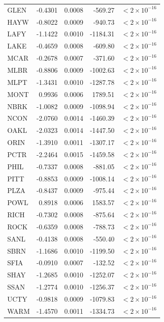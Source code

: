 \documentclass[11pt, letterpaper]{article}
\begin{document}
\begin{longtable}{lrrrr}
GLEN  & -0.4301 & 0.0008 &  -569.27 & $<2\times10^{-16}$ \\
HAYW  & -0.8022 & 0.0009 &  -940.73 & $<2\times10^{-16}$ \\
LAFY  & -1.1422 & 0.0010 & -1184.31 & $<2\times10^{-16}$ \\
LAKE  & -0.4659 & 0.0008 &  -609.80 & $<2\times10^{-16}$ \\
MCAR  & -0.2678 & 0.0007 &  -371.60 & $<2\times10^{-16}$ \\
MLBR  & -0.8806 & 0.0009 & -1002.63 & $<2\times10^{-16}$ \\
MLPT  & -1.3431 & 0.0010 & -1287.78 & $<2\times10^{-16}$ \\
MONT  &  0.9936 & 0.0006 &  1789.51 & $<2\times10^{-16}$ \\
NBRK  & -1.0082 & 0.0009 & -1098.94 & $<2\times10^{-16}$ \\
NCON  & -2.0760 & 0.0014 & -1460.39 & $<2\times10^{-16}$ \\
OAKL  & -2.0323 & 0.0014 & -1447.50 & $<2\times10^{-16}$ \\
ORIN  & -1.3910 & 0.0011 & -1307.17 & $<2\times10^{-16}$ \\
PCTR  & -2.2464 & 0.0015 & -1459.58 & $<2\times10^{-16}$ \\
PHIL  & -0.7337 & 0.0008 &  -881.05 & $<2\times10^{-16}$ \\
PITT  & -0.8853 & 0.0009 & -1008.14 & $<2\times10^{-16}$ \\
PLZA  & -0.8437 & 0.0009 &  -975.44 & $<2\times10^{-16}$ \\
POWL  &  0.8918 & 0.0006 &  1583.57 & $<2\times10^{-16}$ \\
RICH  & -0.7302 & 0.0008 &  -875.64 & $<2\times10^{-16}$ \\
ROCK  & -0.6359 & 0.0008 &  -788.73 & $<2\times10^{-16}$ \\
SANL  & -0.4138 & 0.0008 &  -550.40 & $<2\times10^{-16}$ \\
SBRN  & -1.1686 & 0.0010 & -1199.50 & $<2\times10^{-16}$ \\
SFIA  & -0.0910 & 0.0007 &  -132.52 & $<2\times10^{-16}$ \\
SHAY  & -1.2685 & 0.0010 & -1252.07 & $<2\times10^{-16}$ \\
SSAN  & -1.2774 & 0.0010 & -1256.37 & $<2\times10^{-16}$ \\
UCTY  & -0.9818 & 0.0009 & -1079.83 & $<2\times10^{-16}$ \\
WARM  & -1.4570 & 0.0011 & -1334.73 & $<2\times10^{-16}$ \\

\end{longtable}
\end{document}
